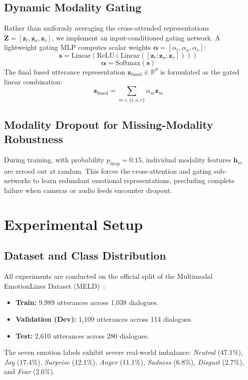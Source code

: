 \documentclass[10pt,twocolumn,letterpaper]{article}
\begin{document}
\subsection{Dynamic Modality Gating}
Rather than uniformly averaging the cross-attended representations $\mathbf{Z} = [\mathbf{z}_t, \mathbf{z}_a, \mathbf{z}_v]$, we implement an input-conditioned gating network. A lightweight gating MLP computes scalar weights $\mathbf{\alpha} = [\alpha_t, \alpha_a, \alpha_v]$:
\begin{equation}
    \mathbf{s} = \text{Linear}(\text{ReLU}(\text{Linear}([\mathbf{z}_t; \mathbf{z}_a; \mathbf{z}_v])))
\end{equation}
\begin{equation}
    \mathbf{\alpha} = \text{Softmax}(\mathbf{s})
\end{equation}
The final fused utterance representation $\mathbf{z}_{\text{fused}} \in \mathbb{R}^d$ is formulated as the gated linear combination:
\begin{equation}
    \mathbf{z}_{\text{fused}} = \sum_{m \in \{t, a, v\}} \alpha_m \mathbf{z}_m
\end{equation}

\subsection{Modality Dropout for Missing-Modality Robustness}
During training, with probability $p_{\text{drop}} = 0.15$, individual modality features $\mathbf{h}_m$ are zeroed out at random. This forces the cross-attention and gating sub-networks to learn redundant emotional representations, precluding complete failure when cameras or audio feeds encounter dropout.

\section{Experimental Setup}
\label{sec:setup}

\subsection{Dataset and Class Distribution}
All experiments are conducted on the official split of the Multimodal EmotionLines Dataset (MELD)~\cite{poria2019meld}:
\begin{itemize}
    \item \textbf{Train:} 9,989 utterances across 1,038 dialogues.
    \item \textbf{Validation (Dev):} 1,109 utterances across 114 dialogues.
    \item \textbf{Test:} 2,610 utterances across 280 dialogues.
\end{itemize}
The seven emotion labels exhibit severe real-world imbalance: \textit{Neutral} (47.1\%), \textit{Joy} (17.4\%), \textit{Surprise} (12.1\%), \textit{Anger} (11.1\%), \textit{Sadness} (6.8\%), \textit{Disgust} (2.7\%), and \textit{Fear} (2.6\%).
\end{document}

